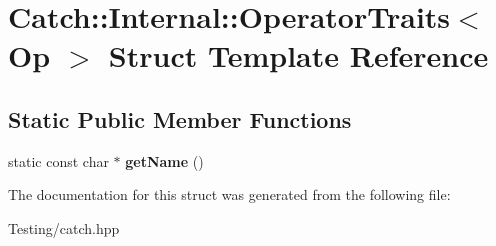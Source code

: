 \hypertarget{struct_catch_1_1_internal_1_1_operator_traits}{\section{Catch\-:\-:Internal\-:\-:Operator\-Traits$<$ Op $>$ Struct Template Reference}
\label{struct_catch_1_1_internal_1_1_operator_traits}
}
\subsection*{Static Public Member Functions}
\begin{DoxyCompactItemize}
\item 
\hypertarget{struct_catch_1_1_internal_1_1_operator_traits_ac6d08082ea33348d42bc4ccbd6d07671}{static const char $\ast$ {\bfseries get\-Name} ()}\label{struct_catch_1_1_internal_1_1_operator_traits_ac6d08082ea33348d42bc4ccbd6d07671}

\end{DoxyCompactItemize}


The documentation for this struct was generated from the following file\-:\begin{DoxyCompactItemize}
\item 
Testing/catch.\-hpp\end{DoxyCompactItemize}
